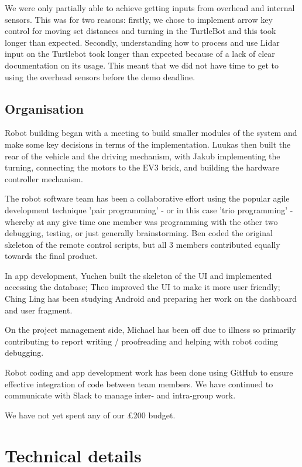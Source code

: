 \documentclass{article}
\begin{document}
We were only partially able to achieve getting inputs from overhead and internal sensors. This was for two reasons: firstly, we chose to implement arrow key control for moving set distances and turning in the TurtleBot and this took longer than expected. Secondly, understanding how to process and use Lidar input on the Turtlebot took longer than expected because of a lack of clear documentation on its usage. This meant that we did not have time to get to using the overhead sensors before the demo deadline.

\subsection{Organisation}

Robot building began with a meeting to build smaller modules of the system and make some key decisions in terms of the implementation. Luukas then built the rear of the vehicle and the driving mechanism, with Jakub implementing the turning, connecting the motors to the EV3 brick, and building the hardware controller mechanism.

The robot software team has been a collaborative effort using the popular agile development technique 'pair programming' - or in this case 'trio programming' - whereby at any give time one member was programming with the other two debugging, testing, or just generally brainstorming. Ben coded the original skeleton of the remote control scripts, but all 3 members contributed equally towards the final product.

In app development, Yuchen built the skeleton of the UI and implemented accessing the database; Theo improved the UI to make it more user friendly; Ching Ling has been studying Android and preparing her work on the dashboard and user fragment.

On the project management side, Michael has been off due to illness so primarily contributing to report writing / proofreading and helping with robot coding debugging. 

Robot coding and app development work has been done using GitHub to ensure effective integration of code between team members. We have continued to communicate with Slack to manage inter- and intra-group work.

We have not yet spent any of our £200 budget.

\section{Technical details}
\end{document}
